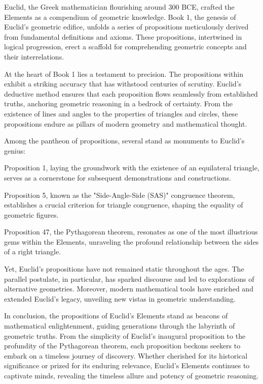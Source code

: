 Euclid, the Greek mathematician flourishing around 300 BCE, crafted the Elements as a compendium of geometric knowledge. Book 1, the genesis of Euclid's geometric edifice, unfolds a series of propositions meticulously derived from fundamental definitions and axioms. These propositions, intertwined in logical progression, erect a scaffold for comprehending geometric concepts and their interrelations.

At the heart of Book 1 lies a testament to precision. The propositions within exhibit a striking accuracy that has withstood centuries of scrutiny. Euclid's deductive method ensures that each proposition flows seamlessly from established truths, anchoring geometric reasoning in a bedrock of certainty. From the existence of lines and angles to the properties of triangles and circles, these propositions endure as pillars of modern geometry and mathematical thought.

Among the pantheon of propositions, several stand as monuments to Euclid's genius:

Proposition 1, laying the groundwork with the existence of an equilateral triangle, serves as a cornerstone for subsequent demonstrations and constructions.

Proposition 5, known as the "Side-Angle-Side (SAS)" congruence theorem, establishes a crucial criterion for triangle congruence, shaping the equality of geometric figures.

Proposition 47, the Pythagorean theorem, resonates as one of the most illustrious gems within the Elements, unraveling the profound relationship between the sides of a right triangle.

Yet, Euclid's propositions have not remained static throughout the ages. The parallel postulate, in particular, has sparked discourse and led to explorations of alternative geometries. Moreover, modern mathematical tools have enriched and extended Euclid's legacy, unveiling new vistas in geometric understanding.

In conclusion, the propositions of Euclid's Elements stand as beacons of mathematical enlightenment, guiding generations through the labyrinth of geometric truths. From the simplicity of Euclid's inaugural proposition to the profundity of the Pythagorean theorem, each proposition beckons seekers to embark on a timeless journey of discovery. Whether cherished for its historical significance or prized for its enduring relevance, Euclid's Elements continues to captivate minds, revealing the timeless allure and potency of geometric reasoning.




